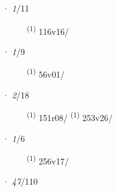 \ENTRYEND
\noindent{} · \textit{1}/11 \LEMMALINE
\begin{description}
    \item[]  \textsuperscript{(1)} \mbox{116v16/}
\end{description}
\ENTRYEND
\noindent{} · \textit{1}/9 \LEMMALINE
\begin{description}
    \item[]  \textsuperscript{(1)} \mbox{56v01/}
\end{description}
\ENTRYEND
\noindent{} · \textit{2}/18 \LEMMALINE
\begin{description}
    \item[]  \textsuperscript{(1)} \mbox{151r08/} \CASEBREAK {} \textsuperscript{(1)} \mbox{253v26/}
\end{description}
\ENTRYEND
\noindent{} · \textit{1}/6 \LEMMALINE
\begin{description}
    \item[]  \textsuperscript{(1)} \mbox{256v17/}
\end{description}
\ENTRYEND
\noindent{} · \textit{47}/110 \LEMMALINE
